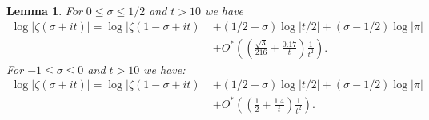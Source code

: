 \documentclass[10pt,english,letter, reqno]{amsart}
\newcommand{\Ostar}{O^{\ast}}
\theoremstyle{plain}
\newtheorem{lemma}[theorem]{Lemma}
\theoremstyle{definition}
\begin{document}
\begin{lemma}\label{lem:zetalessthanhalf}
For $0 \leq \sigma \leq 1/2$ and $t>10$ we have
\begin{align*} \log|\zeta(\sigma+it)| = \log|\zeta(1-\sigma+it)| &+ (1/2-\sigma)\log|t/2|  +(\sigma-1/2)\log|\pi|
\\&+ \Ostar\!\left(\left(\frac{\sqrt3}{216}+\frac{0.17}{t}\right)\frac{1}{t^2}\right). \end{align*}
For $-1\leq \sigma \leq 0$ and $t>10$ we have:
\begin{align*} \log|\zeta(\sigma+it)| = \log|\zeta(1-\sigma+it)| &+ (1/2-\sigma)\log|t/2|  +(\sigma-1/2)\log|\pi|
\\&+  \Ostar\!\left(\left(\frac{1}{2}+\frac{1.4}{t}\right)\frac{1}{t^2}\right). \end{align*}
\end{lemma}
\end{document}
